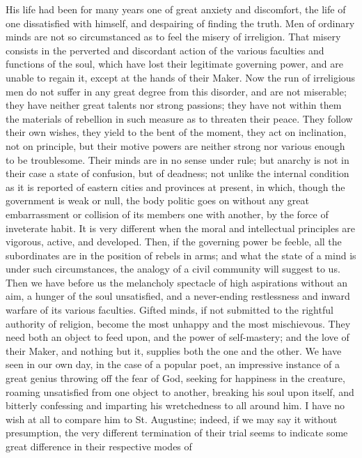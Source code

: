 His life had been for many years one of great anxiety and
discomfort, the life of one dissatisfied with himself, and despairing
of finding the truth. Men of ordinary minds are not so circumstanced
as to feel the misery of irreligion. That misery consists in the
perverted and discordant action of the various faculties and functions
of the soul, which have lost their legitimate governing power, and are
unable to regain it, except at the hands of their Maker. Now the run
of irreligious men do not suffer in any great degree from this
disorder, and are not miserable; they have neither great talents nor
strong passions; they have not within them the materials of rebellion
in such measure as to threaten their peace. They follow their own
wishes, they yield to the bent of the moment, they act on inclination,
not on principle, but their motive powers are neither strong nor
various enough to be troublesome. Their minds are in no sense under
rule; but anarchy is not in their case a state of confusion, but of
deadness; not unlike the internal condition as it is reported of
eastern cities and provinces at present, in which, though the
government is weak or null, the body politic goes on without any great
embarrassment or collision of its members one with another, by the
force of inveterate habit. It is very different when the moral and
intellectual principles are vigorous, active, and developed.
Then, if the governing power be feeble, all the subordinates are in
the position of rebels in arms; and what the state of a mind is under
such circumstances, the analogy of a civil community will suggest to
us. Then we have before us the melancholy spectacle of high
aspirations without an aim, a hunger of the soul unsatisfied, and a
never-ending restlessness and inward warfare of its various faculties.
Gifted minds, if not submitted to the rightful authority of religion,
become the most unhappy and the most mischievous. They need both an
object to feed upon, and the power of self-mastery; and the love of
their Maker, and nothing but it, supplies both the one and the other.
We have seen in our own day, in the case of a popular poet, an
impressive instance of a great genius throwing off the fear of God,
seeking for happiness in the creature, roaming unsatisfied from one
object to another, breaking his soul upon itself, and bitterly
confessing and imparting his wretchedness to all around him. I have no
wish at all to compare him to St. Augustine; indeed, if we may say it
without presumption, the very different termination of their trial
seems to indicate some great difference in their respective modes of
